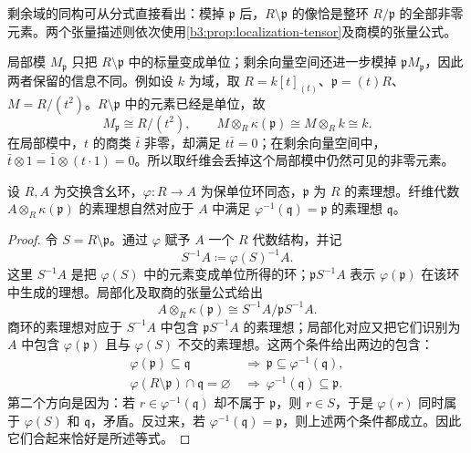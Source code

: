 剩余域的同构可从分式直接看出：模掉 \(\mathfrak p\) 后，\(R\setminus\mathfrak p\) 的像恰是整环 \(R/\mathfrak p\) 的全部非零元素。两个张量描述则依次使用\cref{b3:prop:localization-tensor}及商模的张量公式。

\ProseParagraphBreak
局部模 \(M_{\mathfrak p}\) 只把 \(R\setminus\mathfrak p\) 中的标量变成单位；剩余向量空间还进一步模掉 \(\mathfrak pM_{\mathfrak p}\)，因此两者保留的信息不同。例如设 \(k\) 为域，取 \(R=k[t]_{(t)}\)、\(\mathfrak p=(t)R\)、\(M=R/(t^2)\)。\(R\setminus\mathfrak p\) 中的元素已经是单位，故
\[
	M_{\mathfrak p}\cong R/(t^2),\qquad M\otimes_R\kappa(\mathfrak p)\cong M\otimes_R k\cong k.
\]
在局部模中，\(t\) 的商类 \(\bar t\) 非零，却满足 \(t\bar t=0\)；在剩余向量空间中，\(\bar t\otimes1=\bar1\otimes(t\cdot1)=0\)。所以取纤维会丢掉这个局部模中仍然可见的非零元素。

\begin{proposition}\label{b3:prop:fibre-spectrum}
	设 \(R,A\) 为交换含幺环，\(\varphi:R\to A\) 为保单位环同态，\(\mathfrak p\) 为 \(R\) 的素理想。纤维代数 \(A\otimes_R\kappa(\mathfrak p)\) 的素理想自然对应于 \(A\) 中满足 \(\varphi^{-1}(\mathfrak q)=\mathfrak p\) 的素理想 \(\mathfrak q\)。
\end{proposition}
\begin{proof}
	令 \(S=R\setminus\mathfrak p\)。通过 \(\varphi\) 赋予 \(A\) 一个 \(R\) 代数结构，并记
	\[
		S^{-1}A\coloneqq\varphi(S)^{-1}A.
	\]
	这里 \(S^{-1}A\) 是把 \(\varphi(S)\) 中的元素变成单位所得的环；\(\mathfrak pS^{-1}A\) 表示 \(\varphi(\mathfrak p)\) 在该环中生成的理想。局部化及取商的张量公式给出
	\[
		A\otimes_R\kappa(\mathfrak p) \cong S^{-1}A/\mathfrak pS^{-1}A.
	\]
	商环的素理想对应于 \(S^{-1}A\) 中包含 \(\mathfrak pS^{-1}A\) 的素理想；局部化对应又把它们识别为 \(A\) 中包含 \(\varphi(\mathfrak p)\) 且与 \(\varphi(S)\) 不交的素理想。这两个条件给出两边的包含：
	\[
		\begin{aligned}
			\varphi(\mathfrak p)\subseteq\mathfrak q &\ \Longrightarrow\ \mathfrak p\subseteq\varphi^{-1}(\mathfrak q),\\
			\varphi(R\setminus\mathfrak p)\cap\mathfrak q=\varnothing &\ \Longrightarrow\ \varphi^{-1}(\mathfrak q)\subseteq\mathfrak p.
		\end{aligned}
	\]
	第二个方向是因为：若 \(r\in\varphi^{-1}(\mathfrak q)\) 却不属于 \(\mathfrak p\)，则 \(r\in S\)，于是 \(\varphi(r)\) 同时属于 \(\varphi(S)\) 和 \(\mathfrak q\)，矛盾。反过来，若 \(\varphi^{-1}(\mathfrak q)=\mathfrak p\)，则上述两个条件都成立。因此它们合起来恰好是所述等式。
\end{proof}

